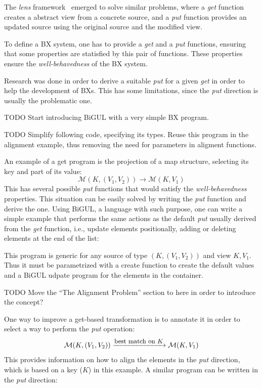 \documentclass[preprint,numbers]{sigplanconf}
\newcommand{\TODO}[1]{{\color{black!10!blue}TODO #1}}
\begin{document}
The \emph{lens} framework~\cite{Greenwald2003} emerged to solve similar
problems, where a \emph{get} function creates a abstract view from a concrete
source, and a \emph{put} function provides an updated source using the original
source and the modified view.

To define a BX system, one has to provide a \emph{get} and a \emph{put}
functions, ensuring that some properties are statisfied by this pair of
functions. These properties ensure the \emph{well-behavedness} of the BX system.

Research was done in order to derive a suitable \emph{put} for a given
\emph{get} in order to help the development of BXs. This has some limitations,
since the \emph{put} direction is usually the problematic one.

%
%

\TODO{Start introducing BiGUL with a very simple BX program.}
%


\TODO{Simplify following code, specifying its types. Reuse this program in the
alignment example, thus removing the need for parameters in aligment functions.}

%
%

An example of a get program is the projection of a map structure, selecting its
key and part of its value:
%
\[ \mathcal M (K, (V_1, V_2)) \longrightarrow \mathcal M (K, V_1) \]
%
This has several possible \emph{put} functions that would satisfy the
\emph{well-behavedness} properties. This situation can be easily solved by
writing the \emph{put} function and derive the one. Using BiGUL, a language with
such purpose, one can write a simple example that performs the same actions as
the default \emph{put} usually derived from the \emph{get} function, i.e.,
update elements positionally, adding or deleting elements at the end of the
list:
%

%
This program is generic for any source of type \((K, (V_1, V_2))\) and view \(K,
V_1\). Thus it must be parametrized with a create function to create the default
values and a BiGUL udpate program for the elements in the container.

\TODO{Move the ``The Alignment Problem'' section to here in order to introduce
the concept?}

%
%

One way to improve a get-based transformation is to annotate it in order
to select a way to perform the \emph{put} operation:
%
\[ \mathcal M (K, (V_1, V_2)) \xrightarrow{\text{\small best match on \(K\)}} \mathcal M (K, V_1) \]
%
This provides information on how to align the elements in the \emph{put}
direction, which is based on a key (\(K\)) in this example. A similar program
can be written in the \emph{put} direction:
%

\end{document}
